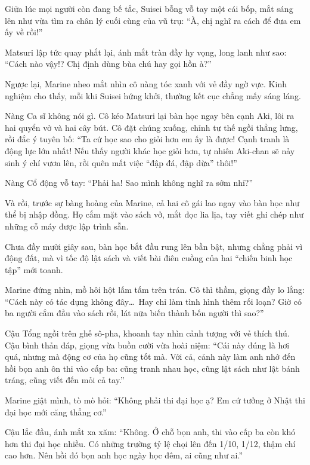 \documentclass[../main.tex]{subfiles}
\begin{document}
Giữa lúc mọi người còn đang bế tắc, Suisei bỗng vỗ tay một cái bốp, mắt sáng lên như vừa tìm ra chân lý cuối cùng của vũ trụ: ``À, chị nghĩ ra cách để đưa em ấy về rồi!''

Matsuri lập tức quay phắt lại, ánh mắt tràn đầy hy vọng, long lanh như sao: ``Cách nào vậy!? Chị định dùng bùa chú hay gọi hồn à?''

Ngược lại, Marine nheo mắt nhìn cô nàng tóc xanh với vẻ đầy ngờ vực. Kinh nghiệm cho thấy, mỗi khi Suisei hứng khởi, thường kết cục chẳng mấy sáng láng.

Nàng Ca sĩ không nói gì. Cô kéo Matsuri lại bàn học ngay bên cạnh Aki, lôi ra hai quyển vở và hai cây bút. Cô đặt chúng xuống, chỉnh tư thế ngồi thẳng lưng, rồi đắc ý tuyên bố: ``Ta cứ học sao cho giỏi hơn em ấy là được! Cạnh tranh là động lực lớn nhất! Nếu thấy người khác học giỏi hơn, tự nhiên Aki-chan sẽ nảy sinh ý chí vươn lên, rồi quên mất việc ``đập đá, đập dừa'' thôi!''

Nàng Cổ động vỗ tay: ``Phải ha! Sao mình không nghĩ ra sớm nhỉ?''

Và rồi, trước sự bàng hoàng của Marine, cả hai cô gái lao ngay vào bàn học như thể bị nhập đồng. Họ cắm mặt vào sách vở, mắt đọc lia lịa, tay viết ghi chép như những cỗ máy được lập trình sẵn.


Chưa đầy mười giây sau, bàn học bắt đầu rung lên bần bật, nhưng chẳng phải vì động đất, mà vì tốc độ lật sách và viết bài điên cuồng của hai ``chiến binh học tập'' mới toanh.

Marine đứng nhìn, mồ hôi hột lấm tấm trên trán. Cô thì thầm, giọng đầy lo lắng: ``Cách này có tác dụng không đây\dots\ Hay chỉ làm tình hình thêm rối loạn? Giờ có ba người cắm đầu vào sách rồi, lát nữa biến thành bốn người thì sao?''

Cậu Tổng ngồi trên ghế sô-pha, khoanh tay nhìn cảnh tượng với vẻ thích thú. Cậu bình thản đáp, giọng vừa buồn cười vừa hoài niệm: ``Cái này đúng là hơi quá, nhưng mà động cơ của họ cũng tốt mà. Với cả, cảnh này làm anh nhớ đến hồi bọn anh ôn thi vào cấp ba: cũng tranh nhau học, cũng lật sách như lật bánh tráng, cũng viết đến mỏi cả tay.''

Marine giật mình, tò mò hỏi: ``Không phải thi đại học ạ? Em cứ tưởng ở Nhật thi đại học mới căng thẳng cơ.''

Cậu lắc đầu, ánh mắt xa xăm: ``Không. Ở chỗ bọn anh, thi vào cấp ba còn khó hơn thi đại học nhiều. Có những trường tỷ lệ chọi lên đến 1/10, 1/12, thậm chí cao hơn. Nên hồi đó bọn anh học ngày học đêm, ai cũng như ai.''
\end{document}
